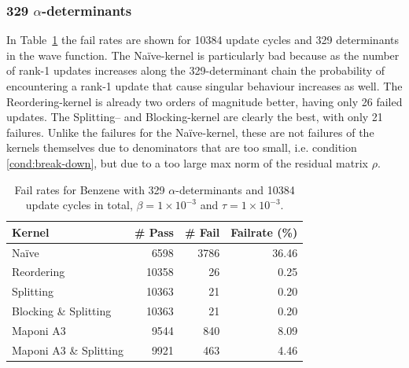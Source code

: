 \documentclass[11pt]{article}
\numberwithin{figure}{section}
\numberwithin{table}{section}
\begin{document}
      \subsubsection{329 $\alpha$-determinants}
        In Table~\ref{tab:fr329} the fail rates are shown for 10384 update cycles and 329 determinants in the wave function. The Na\"{i}ve-kernel is particularly bad because as the number of rank-1 updates increases along the 329-determinant chain the probability of encountering a rank-1 update that cause singular behaviour increases as well. The Reordering-kernel is already two orders of magnitude better, having only 26 failed updates. The Splitting-- and Blocking-kernel are clearly the best, with only 21 failures. Unlike the failures for the Na\"{i}ve-kernel, these are not failures of the kernels themselves due to denominators that are too small, i.e. condition \ref{cond:break-down}, but due to a too large max norm of the residual matrix $\rho$.\\
\begin{table}[h]
	\centering
		\begin{tabular}{@{}lrrr@{}}
			\toprule
			Kernel   & \# Pass & \# Fail & Failrate (\%) \\ \midrule
			Na\"{i}ve    & 6598     	&  3786           &    36.46      \\
			Reordering    & 10358 		& 26              &    0.25      \\
			Splitting    & 10363 		&  21           &      0.20    \\
			Blocking \& Splitting    & 10363  	& 21              &   0.20       \\
			Maponi A3  & 9544 	&  840            &  8.09        \\
			Maponi A3 \& Splitting & 9921   &  463           &   4.46       \\ \bottomrule
		\end{tabular}
		\caption{Fail rates for Benzene with 329 $\alpha$-determinants and 10384 update cycles in total, $\beta=1\times10^{-3}$ and $\tau=1\times10^{-3}$.}
		\label{tab:fr329}
\end{table}
				
\end{document}
